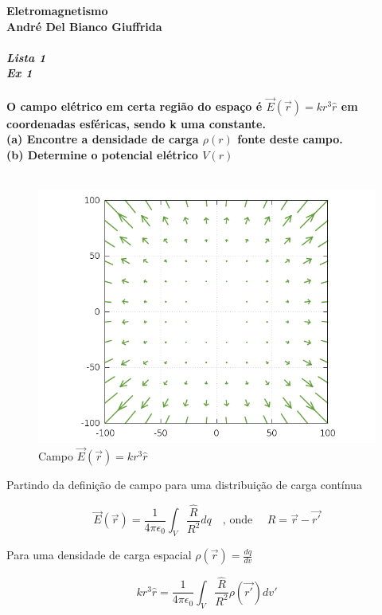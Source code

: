 \documentclass[a4paper,11pt]{exam}
\begin{document}
\begingroup 
	  \bf \Large Eletromagnetismo\\
	  \indent \normalsize André Del Bianco Giuffrida
	\endgroup
	\\ \quad
	\\
	\large{
	\emph{Lista 1 \\ Ex 1}
	\\
	\\
	O campo elétrico em certa região do espaço é $\vec{E}(\vec{r}) = kr^3 \hat{r}$ em coordenadas esféricas, sendo k uma constante. \\
	(a) Encontre a densidade de carga $\rho(r)$ fonte deste campo.
	\\
	(b) Determine o potencial elétrico $V(r)$}
	\\
	\\
	
	\normalsize
	\begin{figure}[h]
		\centering
		\includegraphics[scale=0.7]{Field2.png}
		\caption{ Campo $\vec{E}(\vec{r}) = kr^3 \hat{r}$}
	\end{figure}
	
	Partindo da definição de campo para uma distribuição de carga contínua
	
	\[\vec{E}(\vec{r}) = \frac{1}{4 \pi \epsilon_0} \int_{V} \frac{\hat R}{R^2}dq \quad \text{, onde } \quad R = \vec{r} - \vec{r'}\]
	
	Para uma densidade de carga espacial $\rho(\vec{r}) = \frac{dq}{dv}$
	
	\[ kr^3 \hat{r} = \frac{1}{4 \pi \epsilon_0} \int_{V} \frac{\hat R}{R^2} \rho(\vec{r'}) dv'\]
	
\end{document}
